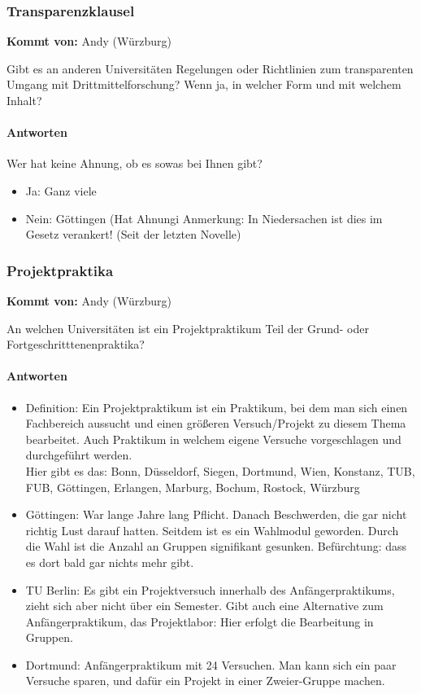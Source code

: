     \subsubsection*{Transparenzklausel}
      \textbf{Kommt von:} Andy (Würzburg)

      Gibt es an anderen Universitäten Regelungen oder Richtlinien zum transparenten Umgang mit Drittmittelforschung? Wenn ja, in welcher Form und mit welchem Inhalt?

      \paragraph{Antworten}
        Wer hat keine Ahnung, ob es sowas bei Ihnen gibt?
        \begin{itemize}
          \item Ja: Ganz viele
          \item Nein: Göttingen (Hat Ahnung^^)
          Anmerkung: In Niedersachen ist dies im Gesetz verankert! (Seit der letzten Novelle)
        \end{itemize}

    \subsubsection*{Projektpraktika}
      \textbf{Kommt von:} Andy (Würzburg)

      An welchen Universitäten ist ein Projektpraktikum Teil der Grund- oder Fortgeschritttenenpraktika?

      \paragraph{Antworten}
        \begin{itemize}
          \item Definition: Ein Projektpraktikum ist ein Praktikum, bei dem man sich einen Fachbereich aussucht und einen größeren Versuch/Projekt zu diesem Thema bearbeitet. Auch Praktikum in welchem eigene Versuche vorgeschlagen und durchgeführt werden. \\
          Hier gibt es das:
          Bonn, Düsseldorf, Siegen, Dortmund, Wien, Konstanz, TUB, FUB, Göttingen, Erlangen, Marburg, Bochum, Rostock, Würzburg
          \item Göttingen: War lange Jahre lang Pflicht. Danach Beschwerden, die gar nicht richtig Lust darauf hatten. Seitdem ist es ein Wahlmodul geworden. Durch die Wahl ist die Anzahl an Gruppen signifikant gesunken. Befürchtung: dass es dort bald gar nichts mehr gibt.
          \item TU Berlin: Es gibt ein Projektversuch innerhalb des Anfängerpraktikums, zieht sich aber nicht über ein Semester. Gibt auch eine Alternative zum Anfängerpraktikum, das Projektlabor: Hier erfolgt die Bearbeitung in Gruppen.
          \item Dortmund: Anfängerpraktikum mit 24 Versuchen. Man kann sich ein paar Versuche sparen, und dafür ein Projekt in einer Zweier-Gruppe machen.

        \end{itemize}

